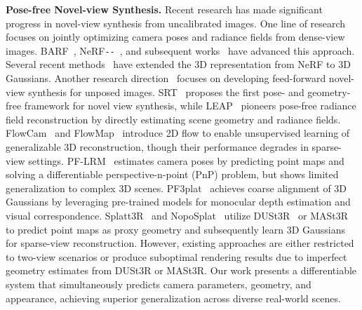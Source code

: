 \noindent\textbf{Pose-free Novel-view Synthesis.}
%
Recent research has made significant progress in novel-view synthesis from uncalibrated images.
% 
One line of research focuses on jointly optimizing camera poses and radiance fields from dense-view images. BARF~\cite{lin2021barf}, NeRF\texttt{-}\texttt{-}~\cite{wang2021nerf}, and subsequent works~\cite{Jeong_2021_ICCV, bian2023nope, truong2023sparf} have advanced this approach.
%
Several recent methods~\cite{Fu_2024_CVPR, keetha2024splatam, fan2024instantsplat} have extended the 3D representation from NeRF to 3D Gaussians.
%
Another research direction~\cite{Sajjadi2022RUSTLN, kani24upfusion, xu2025sparp, jiang2024forge} focuses on developing feed-forward novel-view synthesis for unposed images. 
% 
SRT~\cite{srt22} proposes the first pose- and geometry-free framework for novel view synthesis, while LEAP~\cite{jiang2022LEAP} pioneers  pose-free radiance field reconstruction by directly estimating scene geometry and radiance fields. 
% 
FlowCam~\cite{smith2023flowcam} and FlowMap~\cite{smith2024flowmap} introduce 2D flow to enable unsupervised learning of generalizable 3D reconstruction, though their performance degrades in sparse-view settings.
%
PF-LRM~\cite{wang2023pf} estimates camera poses by predicting point maps and solving a differentiable perspective-n-point (PnP) problem, but shows limited generalization to complex 3D scenes.
%
PF3plat~\cite{hong2024pf3plat} achieves coarse alignment of 3D Gaussians by leveraging pre-trained models for monocular depth estimation and visual correspondence.
%
Splatt3R~\cite{smart2024splatt3r} and NopoSplat~\cite{ye2024no} utilize DUSt3R~\cite{wang2024dust3r} or MASt3R~\cite{leroy2024grounding} to predict point maps as proxy geometry and subsequently learn 3D Gaussians for sparse-view reconstruction.
%
However, existing approaches are either restricted to two-view scenarios or produce suboptimal rendering results due to imperfect geometry estimates from DUSt3R or MASt3R.
%
Our work presents a differentiable system that simultaneously predicts camera parameters, geometry, and appearance, achieving superior generalization across diverse real-world scenes.

